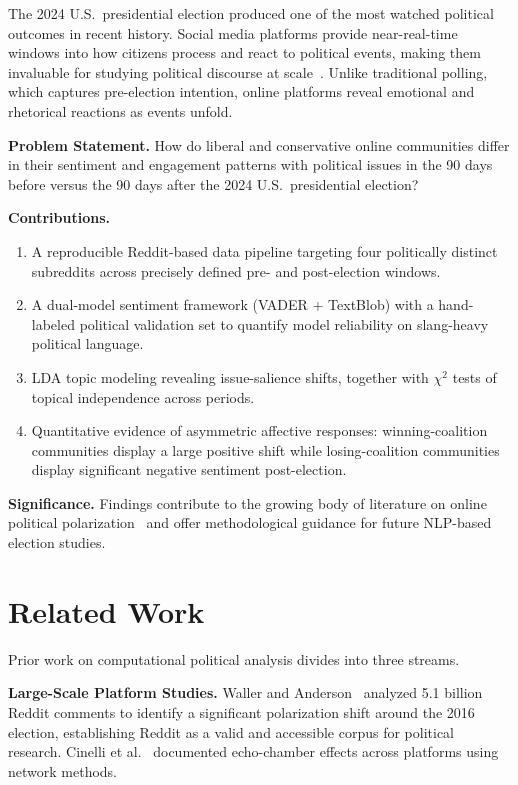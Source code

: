\documentclass[journal]{IEEEtran}
\begin{document}
The 2024 U.S.\ presidential election produced one of the most watched
political outcomes in recent history. Social media platforms provide
near-real-time windows into how citizens process and react to political
events, making them invaluable for studying political discourse at
scale~\cite{tumasjan2010predicting,pak2010twitter}. Unlike traditional
polling, which captures pre-election intention, online platforms reveal
emotional and rhetorical reactions as events unfold.

\textbf{Problem Statement.}
How do liberal and conservative online communities differ in their
sentiment and engagement patterns with political issues in the 90 days
before versus the 90 days after the 2024 U.S.\ presidential election?

\textbf{Contributions.}
\begin{enumerate}
  \item A reproducible Reddit-based data pipeline targeting four
        politically distinct subreddits across precisely defined
        pre- and post-election windows.
  \item A dual-model sentiment framework (VADER + TextBlob) with a
        hand-labeled political validation set to quantify model
        reliability on slang-heavy political language.
  \item LDA topic modeling revealing issue-salience shifts, together
        with $\chi^2$ tests of topical independence across periods.
  \item Quantitative evidence of asymmetric affective responses:
        winning-coalition communities display a large positive shift
        while losing-coalition communities display significant negative
        sentiment post-election.
\end{enumerate}

\textbf{Significance.}
Findings contribute to the growing body of literature on online
political polarization~\cite{waller2021quantifying,cinelli2021echo}
and offer methodological guidance for future NLP-based election
studies.

\section{Related Work}

Prior work on computational political analysis divides into three
streams.

\textbf{Large-Scale Platform Studies.}
Waller and Anderson~\cite{waller2021quantifying} analyzed 5.1 billion
Reddit comments to identify a significant polarization shift around the
2016 election, establishing Reddit as a valid and accessible corpus for
political research. Cinelli et al.~\cite{cinelli2021echo} documented
echo-chamber effects across platforms using network methods.
\end{document}
